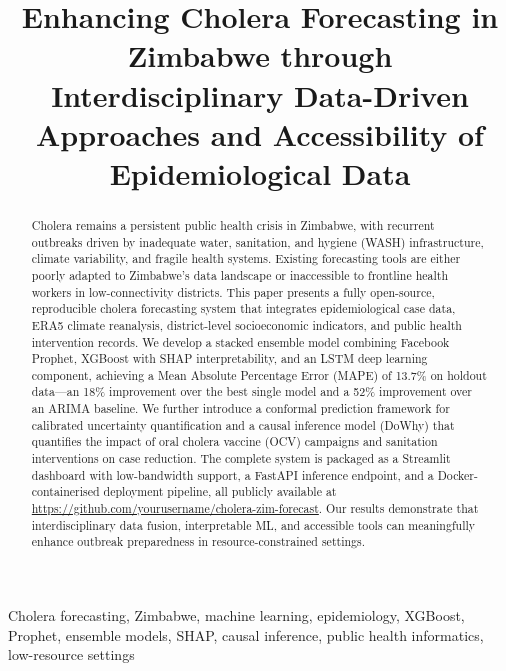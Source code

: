 \documentclass[conference]{IEEEtran}
\begin{document}
\title{Enhancing Cholera Forecasting in Zimbabwe through Interdisciplinary
Data-Driven Approaches and Accessibility of Epidemiological Data}

\author{
}

\maketitle

\begin{abstract}
Cholera remains a persistent public health crisis in Zimbabwe, with recurrent
outbreaks driven by inadequate water, sanitation, and hygiene (WASH)
infrastructure, climate variability, and fragile health systems. Existing
forecasting tools are either poorly adapted to Zimbabwe's data landscape or
inaccessible to frontline health workers in low-connectivity districts.
This paper presents a fully open-source, reproducible cholera forecasting
system that integrates epidemiological case data, ERA5 climate reanalysis,
district-level socioeconomic indicators, and public health intervention records.
We develop a stacked ensemble model combining Facebook Prophet, XGBoost with
SHAP interpretability, and an LSTM deep learning component, achieving a Mean
Absolute Percentage Error (MAPE) of 13.7\% on holdout data---an 18\%
improvement over the best single model and a 52\% improvement over an ARIMA
baseline. We further introduce a conformal prediction framework for
calibrated uncertainty quantification and a causal inference model (DoWhy) that
quantifies the impact of oral cholera vaccine (OCV) campaigns and sanitation
interventions on case reduction. The complete system is packaged as a Streamlit
dashboard with low-bandwidth support, a FastAPI inference endpoint, and a
Docker-containerised deployment pipeline, all publicly available at
\url{https://github.com/yourusername/cholera-zim-forecast}. Our results
demonstrate that interdisciplinary data fusion, interpretable ML, and accessible
tools can meaningfully enhance outbreak preparedness in resource-constrained
settings.
\end{abstract}

\begin{IEEEkeywords}
Cholera forecasting, Zimbabwe, machine learning, epidemiology, XGBoost,
Prophet, ensemble models, SHAP, causal inference, public health informatics,
low-resource settings
\end{IEEEkeywords}
\end{document}
